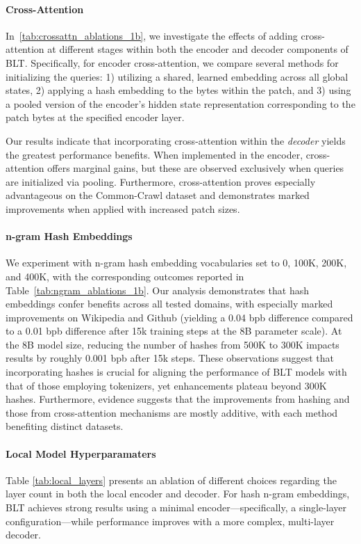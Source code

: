 \paragraph{Cross-Attention} 
In~\autoref{tab:crossattn_ablations_1b}, we investigate the effects of adding cross-attention at different stages within both the encoder and decoder components of {\textsc BLT}. Specifically, for encoder cross-attention, we compare several methods for initializing the queries: 1) utilizing a shared, learned embedding across all global states, 2) applying a hash embedding to the bytes within the patch, and 3) using a pooled version of the encoder’s hidden state representation corresponding to the patch bytes at the specified encoder layer.

Our results indicate that incorporating cross-attention within the \textit{decoder} yields the greatest performance benefits. When implemented in the encoder, cross-attention offers marginal gains, but these are observed exclusively when queries are initialized via pooling. Furthermore, cross-attention proves especially advantageous on the Common-Crawl dataset and demonstrates marked improvements when applied with increased patch sizes.

\paragraph{n-gram Hash Embeddings} 

We experiment with n-gram hash embedding vocabularies set to 0, 100K, 200K, and 400K, with the corresponding outcomes reported in Table~\ref{tab:ngram_ablations_1b}. Our analysis demonstrates that hash embeddings confer benefits across all tested domains, with especially marked improvements on Wikipedia and Github (yielding a 0.04 bpb difference compared to a 0.01 bpb difference after 15k training steps at the 8B parameter scale). At the 8B model size, reducing the number of hashes from 500K to 300K impacts results by roughly 0.001 bpb after 15k steps. These observations suggest that incorporating hashes is crucial for aligning the performance of {\textsc BLT} models with that of those employing tokenizers, yet enhancements plateau beyond 300K hashes. Furthermore, evidence suggests that the improvements from hashing and those from cross-attention mechanisms are mostly additive, with each method benefiting distinct datasets.

\paragraph{Local Model Hyperparamaters} Table \ref{tab:local_layers} presents an ablation of different choices regarding the layer count in both the local encoder and decoder. For hash n-gram embeddings, {\textsc BLT} achieves strong results using a minimal encoder—specifically, a single-layer configuration—while performance improves with a more complex, multi-layer decoder.

